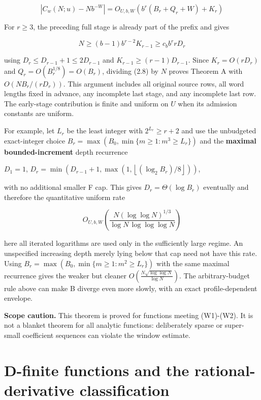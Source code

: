 \documentclass[11pt,a4paper]{article}
\begin{document}
\[
\left|C_w(N;u)-Nb^{-W}\right|=O_{U,b,W}\!\left(b^r(B_r+Q_r+W)+K_r\right) \tag{2.8}
\]

For \(r\ge 3\), the preceding full stage is already part of the prefix
and gives

\[
N \ge  (b-1)b^{r-2} K_{r-1} \ge  c_b b^r r D_r
\]

using \(D_r\le D_{r-1}+1\le 2 D_{r-1}\) and \(K_{r-1}\ge (r-1)D_{r-1}\).
Since \(K_r=O(rD_r)\) and \(Q_r=O(B_r^{1/8})=O(B_r)\), dividing (2.8) by
\(N\) proves Theorem A with \(O(N B_r/(rD_r))\). This argument includes
all original source rows, all word lengths fixed in advance, any
incomplete last stage, and any incomplete last row. The early-stage
contribution is finite and uniform on \(U\) when its admission constants
are uniform.

For example, let \(L_r\) be the least integer with \(2^{L_r} \ge  r+2\)
and use the unbudgeted exact-integer choice
\(B_r=\max(B_0,\min\lbrace m\ge 1: m^3\ge L_r\rbrace )\) and the
\textbf{maximal bounded-increment} depth recurrence

\(D_1=1\),
\(D_r=\min(D_{r-1}+1,\max(1,\left\lfloor (\log_2 B_r)/8\right\rfloor))\),

with no additional smaller F cap. This gives \(D_r=\Theta(\log B_r)\)
eventually and therefore the quantitative uniform rate

\[
O_{U,b,W}\!\left(\frac{N(\log\log N)^{1/3}}{\log N\,\log\log\log N}\right)
\]

here all iterated logarithms are used only in the sufficiently large
\(r\)egime. An unspecified increasing depth merely lying below that cap
need not have this rate. Using
\(B_r=\max(B_0,\min\lbrace m\ge 1: m^2\ge L_r\rbrace )\) with the same
maximal recurrence gives the weaker but cleaner
\(O\!\left(\frac{N\sqrt{\log\log N}}{\log N}\right)\). The
arbitrary-budget rule above can make B diverge even more slowly, with an
exact profile-dependent envelope.

\textbf{Scope caution.} This theorem is proved for functions meeting
(W1)-(W2). It is not a blanket theorem for all analytic functions:
deliberately sparse or super-small coefficient sequences can violate the
window estimate.

\section{D-finite functions and the rational-derivative
classification}\label{d-finite-functions-and-the-rational-derivative-classification}
\end{document}
